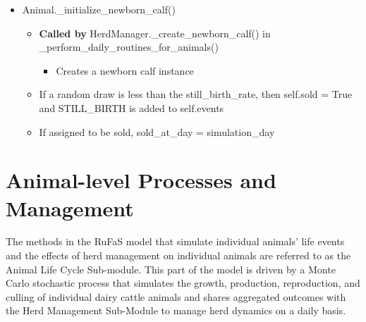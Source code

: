 \documentclass{article}
\begin{document}
\begin{refsection}
        \begin{itemize}
            \item Animal.\_initialize\_newborn\_calf()
            \begin{itemize}
                \item \textbf{Called by} HerdManager.\_create\_newborn\_calf() in \_perform\_daily\_routines\_for\_animals()
                \begin{itemize}
                    \item Creates a newborn calf instance
                \end{itemize}
                \item If a random draw is less than the still\_birth\_rate, then self.sold = True and STILL\_BIRTH is added to self.events
                \item If assigned to be sold, sold\_at\_day = simulation\_day 

            \end{itemize} 
        \end{itemize}





















\section{Animal-level Processes and Management}\label{sec:AnManage}

The methods in the RuFaS model that simulate individual animals’ life events and the effects of herd management on individual animals are referred to as the Animal Life Cycle Sub-module. This part of the model is driven by a Monte Carlo stochastic process that simulates the growth, production, reproduction, and culling of individual dairy cattle animals and shares aggregated outcomes with the Herd Management Sub-Module to manage herd dynamics on a daily basis.


\end{refsection}
\end{document}

